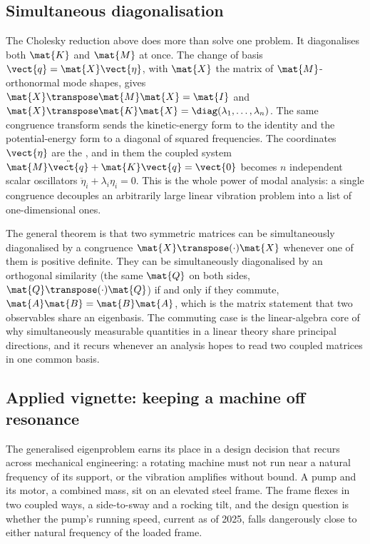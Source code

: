 \subsection{Simultaneous diagonalisation}

The Cholesky reduction above does more than solve one problem. It
diagonalises both $\mat{K}$ and $\mat{M}$ at once. The change of basis
$\vect{q} = \mat{X}\vect{\eta}$, with $\mat{X}$ the matrix of
$\mat{M}$-orthonormal mode shapes, gives $\mat{X}\transpose\mat{M}
\mat{X} = \mat{I}$ and $\mat{X}\transpose\mat{K}\mat{X} =
\diag(\lambda_{1}, \ldots, \lambda_{n})$. The same congruence transform
sends the kinetic-energy form to the identity and the potential-energy
form to a diagonal of squared frequencies. The coordinates
$\vect{\eta}$ are the , and in them the
coupled system $\mat{M}\ddot{\vect{q}} + \mat{K}\vect{q} = \vect{0}$
becomes $n$ independent scalar oscillators $\ddot{\eta}_{i} +
\lambda_{i}\eta_{i} = 0$. This is the whole power of modal analysis:
a single congruence decouples an arbitrarily large linear vibration
problem into a list of one-dimensional ones.

The general theorem is that two symmetric matrices can be simultaneously
diagonalised by a congruence $\mat{X}\transpose(\cdot)\mat{X}$ whenever
one of them is positive definite. They can be simultaneously
diagonalised by an orthogonal similarity (the same $\mat{Q}$ on both
sides, $\mat{Q}\transpose(\cdot)\mat{Q}$) if and only if they commute,
$\mat{A}\mat{B} = \mat{B}\mat{A}$, which is the matrix statement that
two observables share an eigenbasis. The commuting case is the
linear-algebra core of why simultaneously measurable quantities in a
linear theory share principal directions, and it recurs whenever an
analysis hopes to read two coupled matrices in one common basis.

\subsection{Applied vignette: keeping a machine off resonance}

The generalised eigenproblem earns its place in a design decision that
recurs across mechanical engineering: a rotating machine must not run
near a natural frequency of its support, or the vibration amplifies
without bound. A pump and its motor, a combined mass, sit on an
elevated steel frame. The frame flexes in two coupled ways, a
side-to-sway and a rocking tilt, and the design question is whether the
pump's running speed, current as of 2025, falls dangerously close to
either natural frequency of the loaded frame.

